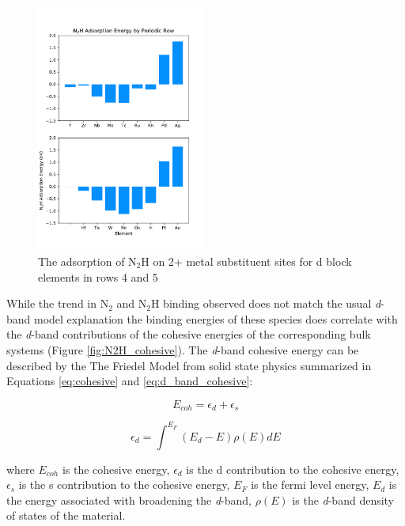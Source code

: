 \begin{figure}
    \centering
    \includegraphics[width=0.5\textwidth]{Images/N2H_adsorption_rows.pdf}
    \caption{The adsorption of N$_2$H on 2+ metal substituent sites for d block elements in rows 4 and 5}
    \label{fig:N2H_rows}
\end{figure}

While the trend in N$_2$ and N$_2$H binding observed does not match the usual \textit{d}-band model explanation the binding energies of these species does correlate with the \textit{d}-band contributions of the cohesive energies of the corresponding bulk systems (Figure \ref{fig:N2H_cohesive}). The \textit{d}-band cohesive energy can be described by the The Friedel Model \cite{1969TPom} from solid state physics summarized in Equations \ref{eq:cohesive} and \ref{eq:d_band_cohesive}:


\begin{equation}
    E_{coh} = \epsilon_d + \epsilon_s
    \label{eq:cohesive}
\end{equation}

\begin{equation}
    \epsilon_d = \int^{E_F} (E_d-E)\rho(E)dE
    \label{eq:d_band_cohesive}
\end{equation}

where $E_{coh}$ is the cohesive energy, $\epsilon_d$ is the d contribution to the cohesive energy, $\epsilon_s$ is the s contribution to the cohesive energy, $E_F$ is the fermi level energy, $E_d$ is the energy associated with broadening the \textit{d}-band, $\rho(E)$ is the \textit{d}-band density of states of the material. 

